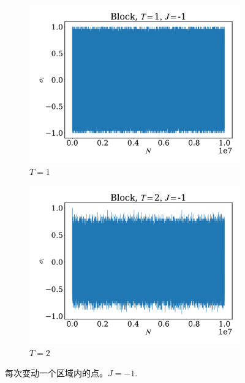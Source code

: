 \documentclass[12pt]{article}
\begin{document}
\begin{figure}
	\begin{subfigure}[b]{0.49\textwidth}
		\centering
		\includegraphics[width=\textwidth]{fig1DJ1N1e7/sig_b_T1J-1.pdf}
		\caption{$T=1$}
	\end{subfigure}
	\begin{subfigure}[b]{0.49\textwidth}
		\centering
		\includegraphics[width=\textwidth]{fig1DJ1N1e7/sig_b_T2J-1.pdf}
		\caption{$T=2$}
	\end{subfigure}
	\caption{每次变动一个区域内的点。$J=-1$.}
	\label{fig:EbJ-1}
\end{figure}
\end{document}
